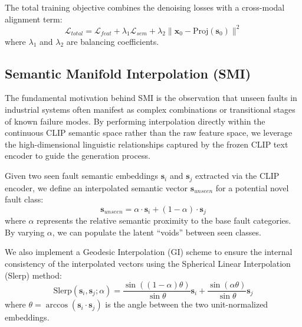 \documentclass[journal,12pt,onecolumn]{IEEEtran}
\begin{document}


The total training objective combines the denoising losses with a cross-modal alignment term:
\begin{equation}
\mathcal{L}_{total} = \mathcal{L}_{feat} + \lambda_1 \mathcal{L}_{sem} + \lambda_2 \| \mathbf{x}_0 - \text{Proj}(\mathbf{s}_0) \|^2
\end{equation}
where $\lambda_1$ and $\lambda_2$ are balancing coefficients.

\subsection{Semantic Manifold Interpolation (SMI)}
The fundamental motivation behind SMI is the observation that unseen faults in industrial systems often manifest as complex combinations or transitional stages of known failure modes. By performing interpolation directly within the continuous CLIP semantic space rather than the raw feature space, we leverage the high-dimensional linguistic relationships captured by the frozen CLIP text encoder to guide the generation process.

Given two seen fault semantic embeddings $\mathbf{s}_i$ and $\mathbf{s}_j$ extracted via the CLIP encoder, we define an interpolated semantic vector $\mathbf{s}_{unseen}$ for a potential novel fault class:
\begin{equation}
\mathbf{s}_{unseen} = \alpha \cdot \mathbf{s}_i + (1 - \alpha) \cdot \mathbf{s}_j
\end{equation}
where $\alpha$ represents the relative semantic proximity to the base fault categories. By varying $\alpha$, we can populate the latent ``voids'' between seen classes.

We also implement a Geodesic Interpolation (GI) scheme to ensure the internal consistency of the interpolated vectors using the Spherical Linear Interpolation (Slerp) method:
\begin{equation}
\text{Slerp}(\mathbf{s}_i, \mathbf{s}_j; \alpha) = \frac{\sin((1-\alpha)\theta)}{\sin \theta} \mathbf{s}_i + \frac{\sin(\alpha \theta)}{\sin \theta} \mathbf{s}_j
\end{equation}
where $\theta = \arccos(\mathbf{s}_i \cdot \mathbf{s}_j)$ is the angle between the two unit-normalized embeddings.
\end{document}
